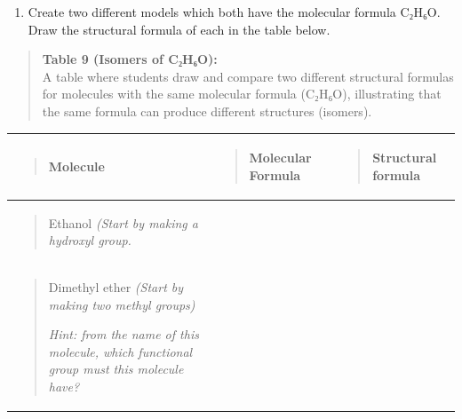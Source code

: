 \documentclass[
  letterpaper,
  DIV=11,
  numbers=noendperiod]{scrreprt}
\newcounter{none} %
\providecommand{\tightlist}{%
  \setlength{\itemsep}{0pt}\setlength{\parskip}{0pt}}
\begin{document}
\begin{enumerate}
\def\labelenumi{\arabic{enumi}.}
\setcounter{enumi}{3}
\tightlist
\item
  Create two different models which both have the molecular formula
  C₂H₆O. Draw the structural formula of each in the table below.
\end{enumerate}

\begin{quote}
\textbf{Table 9 (Isomers of C₂H₆O):}\\
A table where students draw and compare two different structural
formulas for molecules with the same molecular formula (C₂H₆O),
illustrating that the same formula can produce different structures
(isomers).
\end{quote}

{\def\LTcaptype{none} %
\begin{longtable}[]{@{}
  >{\raggedright\arraybackslash}p{}
  >{\raggedright\arraybackslash}p{}
  >{\raggedright\arraybackslash}p{}@{}}
\toprule\noalign{}
\begin{minipage}[b]{\linewidth}\raggedright
\begin{quote}
\textbf{Molecule}
\end{quote}
\end{minipage} & \begin{minipage}[b]{\linewidth}\raggedright
\begin{quote}
\textbf{Molecular Formula}
\end{quote}
\end{minipage} & \begin{minipage}[b]{\linewidth}\raggedright
\begin{quote}
\textbf{Structural formula}
\end{quote}
\end{minipage} \\
\midrule\noalign{}
\endhead
\bottomrule\noalign{}
\endlastfoot
\begin{minipage}[t]{\linewidth}\raggedright
\begin{quote}
Ethanol \emph{(Start by making a hydroxyl group.}
\end{quote}
\end{minipage} & & \\
\begin{minipage}[t]{\linewidth}\raggedright
\begin{quote}
Dimethyl ether \emph{(Start by making two methyl groups)}

\emph{Hint: from the name of this molecule, which functional group must
this molecule have?}
\end{quote}
\end{minipage} & & \\
\end{longtable}
}
\end{document}
